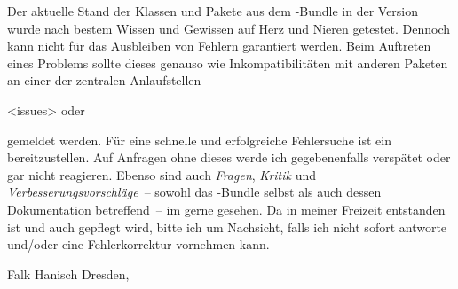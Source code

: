 Der aktuelle Stand der Klassen und Pakete aus dem \TUDScript-Bundle in der 
Version~\vTUDScript{} wurde nach bestem Wissen und Gewissen auf Herz und Nieren 
getestet. Dennoch kann nicht für das Ausbleiben von Fehlern garantiert werden. 
Beim Auftreten eines Problems sollte dieses genauso wie Inkompatibilitäten mit 
anderen Paketen an einer der zentralen Anlaufstellen
\begin{quoting}
\renewcommand*\hrfn[2]{\url{#1}~(#2)}
\GitHubRepo<issues> oder\newline\Forum%
\end{quoting}
gemeldet werden. Für eine schnelle und erfolgreiche Fehlersuche ist ein 
bereitzustellen. Auf Anfragen ohne dieses werde ich gegebenenfalls verspätet 
oder gar nicht reagieren. Ebenso sind auch \emph{Fragen}, \emph{Kritik} und 
\emph{Verbesserungsvorschläge}~-- sowohl das \TUDScript-Bundle selbst als auch 
dessen Dokumentation betreffend~-- im \TUDForum gerne gesehen. Da \TUDScript in 
meiner Freizeit entstanden ist und auch gepflegt wird, bitte ich um Nachsicht, 
falls ich nicht sofort antworte und/oder eine Fehlerkorrektur vornehmen kann.

\bigskip
\noindent Falk Hanisch\newline
Dresden, 
